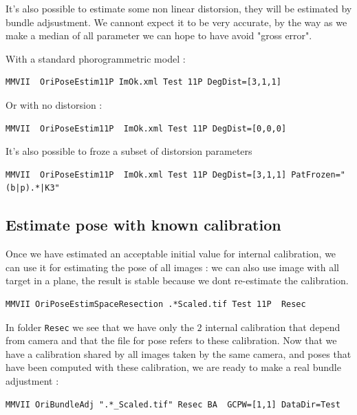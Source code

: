 It's also possible to estimate some non linear distorsion, they will be
estimated by bundle adjsustment. We cannont expect it to be  very accurate,
by the way as we make a median of all parameter we can hope to have 
avoid "gross  error".

With a standard phorogrammetric model :

\begin{lstlisting}
MMVII  OriPoseEstim11P ImOk.xml Test 11P DegDist=[3,1,1]
\end{lstlisting}

Or with no distorsion :

\begin{lstlisting}
MMVII  OriPoseEstim11P  ImOk.xml Test 11P DegDist=[0,0,0]
\end{lstlisting}

It's also possible to froze a subset of distorsion parameters 

\begin{lstlisting}
MMVII  OriPoseEstim11P  ImOk.xml Test 11P DegDist=[3,1,1] PatFrozen="(b|p).*|K3"
\end{lstlisting}


\subsection{Estimate pose with known calibration}

Once we have estimated an acceptable initial value for internal 
calibration, we can use it for estimating the pose of all images :
we can also use image with all target in a plane, the result is stable
because we dont re-estimate the calibration.

\begin{lstlisting}
MMVII OriPoseEstimSpaceResection .*Scaled.tif Test 11P  Resec
\end{lstlisting}

In folder {\tt Resec} we see that we have only the $2$ internal calibration
that depend from camera and that the file for pose refers to these calibration.
Now that we have a calibration shared by all images taken by the same camera, and 
poses that have been computed with these calibration, we are ready to make
a real bundle adjustment :


\begin{lstlisting}
MMVII OriBundleAdj ".*_Scaled.tif" Resec BA  GCPW=[1,1] DataDir=Test
\end{lstlisting}

